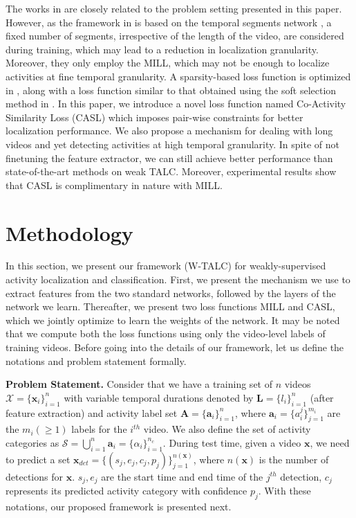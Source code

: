 \documentclass[runningheads]{llncs}
\begin{document}
The works in \cite{wang2017untrimmednets,nguyen2017weakly} are closely related to the problem setting presented in this paper. However, as the framework in \cite{wang2017untrimmednets} is based on the temporal segments network \cite{wang2016temporal}, a fixed number of segments, irrespective of the length of the video, are considered during training, which may lead to a reduction in localization granularity. Moreover, they only employ the MILL, which may not be enough to localize activities at fine temporal granularity. A sparsity-based loss function is optimized in \cite{nguyen2017weakly}, along with a loss function similar to that obtained using the soft selection method in \cite{wang2017untrimmednets}. In this paper, we introduce a novel loss function named Co-Activity Similarity Loss (CASL) which imposes pair-wise constraints for better localization performance. We also propose a mechanism for dealing with long videos and yet detecting activities at high temporal granularity. In spite of not finetuning the feature extractor, we can still achieve better performance than state-of-the-art methods on weak TALC. Moreover, experimental results show that CASL is complimentary in nature with MILL. 

\section{Methodology}
In this section, we present our framework (W-TALC) for weakly-supervised activity localization and classification. First, we present the mechanism we use to extract features from the two standard networks, followed by the layers of the network we learn. Thereafter, we present two loss functions MILL and CASL, which we jointly optimize to learn the weights of the network. It may be noted that we compute both the loss functions using only the video-level labels of training videos. Before going into the details of our framework, let us define the notations and problem statement formally. 

\textbf{Problem Statement.} Consider that we have a training set of $n$ videos $\mathcal{X}=\{\boldsymbol{x}_i\}_{i=1}^n$ with variable temporal durations denoted by $\boldsymbol{L}=\{l_i\}_{i=1}^n$ (after feature extraction) and activity label set $\boldsymbol{A}=\{\boldsymbol{a}_i\}_{i=1}^n$, where $\boldsymbol{a}_i=\{a_i^j\}_{j=1}^{m_i}$ are the $m_i (\geq 1)$ labels for the $i^{th}$ video. We also define the set of activity categories as $\mathcal{S}=\bigcup_{i=1}^n\boldsymbol{a}_i=\{\alpha_i\}_{i=1}^{n_c}$. During test time, given a video $\boldsymbol{x}$, we need to predict a set $\boldsymbol{x}_{det}=\{(s_j,e_j,c_j,p_j)\}_{j=1}^{n(\boldsymbol{x})}$, where $n(\boldsymbol{x})$ is the number of detections for $\boldsymbol{x}$. $s_j,e_j$ are the start time and end time of the $j^{th}$ detection, $c_j$ represents its predicted activity category with confidence $p_j$. With these notations, our proposed framework is presented next. 
\end{document}
